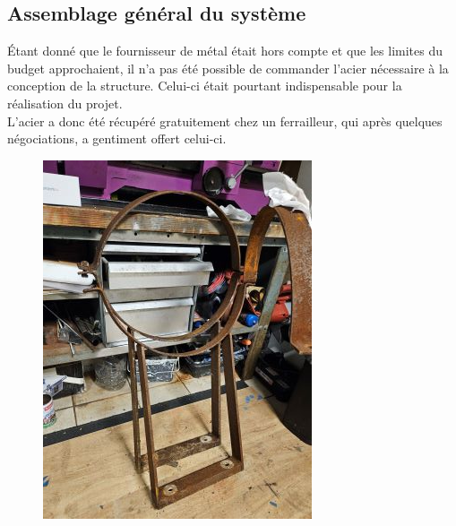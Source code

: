 \documentclass{article}
\begin{document}
\subsection{Assemblage général du système}

Étant donné que le fournisseur de métal était hors compte et que les limites du budget approchaient, il n'a pas été possible de commander l'acier nécessaire à la conception de la structure. Celui-ci était pourtant indispensable pour la réalisation du projet.
\\L'acier a donc été récupéré gratuitement chez un ferrailleur, qui après quelques négociations, a gentiment offert celui-ci.
\begin{figure}[H]
    \centering
    \begin{minipage}{0.45\textwidth}
    \centering
        \includegraphics[width=\linewidth, angle=270]{Images/photoFabrications/metal_roullier.jpg}
    \end{minipage}\hfill
    \begin{minipage}{0.45\textwidth}

\end{minipage}
\end{figure}
\end{document}
